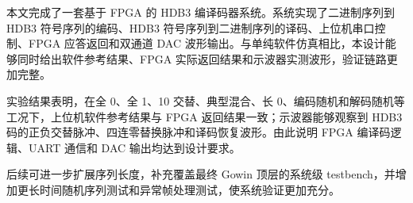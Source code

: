 \documentclass[UTF8,a4paper,12pt]{ctexart}
\begin{document}
本文完成了一套基于 FPGA 的 HDB3 编译码器系统。系统实现了二进制序列到 HDB3 符号序列的编码、HDB3 符号序列到二进制序列的译码、上位机串口控制、FPGA 应答返回和双通道 DAC 波形输出。与单纯软件仿真相比，本设计能够同时给出软件参考结果、FPGA 实际返回结果和示波器实测波形，验证链路更加完整。

实验结果表明，在全 0、全 1、10 交替、典型混合、长 0、编码随机和解码随机等工况下，上位机软件参考结果与 FPGA 返回结果一致；示波器能够观察到 HDB3 码的正负交替脉冲、四连零替换脉冲和译码恢复波形。由此说明 FPGA 编译码逻辑、UART 通信和 DAC 输出均达到设计要求。

后续可进一步扩展序列长度，补充覆盖最终 Gowin 顶层的系统级 testbench，并增加更长时间随机序列测试和异常帧处理测试，使系统验证更加充分。
\end{document}
